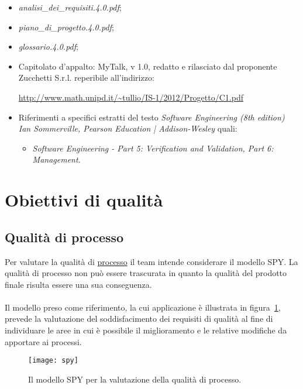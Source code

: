 \begin{itemize}
\item[] \textit{analisi\_dei\_requisiti.4.0.pdf};
\item[] \textit{piano\_di\_progetto.4.0.pdf};
\item[] \textit{glossario.4.0.pdf};
\item[] Capitolato d'appalto: MyTalk, v 1.0, redatto e rilasciato dal proponente Zucchetti S.r.l. reperibile all'indirizzo:
\begin{center}
  \url{http://www.math.unipd.it/~tullio/IS-1/2012/Progetto/C1.pdf}
\end{center}

\item[] Riferimenti a specifici estratti del testo \textit{Software Engineering (8th edition) Ian Sommerville, Pearson Education | Addison-Wesley} quali:
\begin{itemize}
  \item[] \textit{Software Engineering - Part 5: Verification and Validation, Part 6: Management}.\\
\end{itemize}
\end{itemize}
\clearpage

\section{Obiettivi di qualità}

\subsection{Qualità di processo}
Per valutare la qualità di \underline{processo} il team intende considerare il modello SPY. La qualità di processo non può essere trascurata in quanto la qualità del prodotto finale risulta essere una sua conseguenza.\\\\
Il modello preso come riferimento, la cui applicazione è illustrata in figura~\ref{fig:spy}, prevede la valutazione del soddisfacimento dei requisiti di qualità al fine di individuare le aree in cui è possibile il miglioramento e le relative modifiche da apportare ai processi.
 
\begin{figure}[h]
\centering
\texttt{[image: spy]}
\caption{Il modello SPY per la valutazione della qualità di processo.}\label{fig:spy}
\end{figure}

